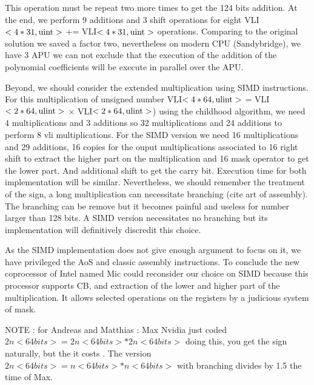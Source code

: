 \documentclass[11pt]{amsart}
\begin{document}
This operation must be repeat two more times to get the 124 bits addition. At the end, we perform 9 additions and 3  shift operations for eight VLI$<4*31, \texttt{\textrm{uint}}>$ += VLI$<4*31, \texttt{\textrm{uint}}>$ operations. 
 Comparing to the original solution we saved a factor two,  nevertheless on modern CPU (Sandybridge), we have 3 APU  we can not exclude that the execution of  the addition of the polynomial coefficients will be execute in parallel over the APU. 

Beyond, we should consider the extended  multiplication using SIMD instructions. For this multiplication of unsigned number   VLI$<4*64, \texttt{\textrm{ulint}}>$  = VLI$<2*64, \texttt{\textrm{ulint}}>$ $\times$ VLI$<2*64, \texttt{\textrm{ulint}}>$) using the
childhood  algorithm, we need 4 multiplications and 3 additions so 32 multiplications and 24 additions to perform 8 vli multiplications. For the SIMD version we need 16 multiplications and 29 additions, 16 copies for the ouput multiplications 
associated to 16 right shift  to extract the higher part on the multiplication and 16 mask operator to get the lower part. And additional shift to get the carry bit. Execution time for both implementation will be similar. Nevertheless, we should remember the treatment of the sign,  a long multiplication can necessitate branching (cite art of assembly). The branching can be remove but it  becomes painful and useless for number larger than 128 bits.  A SIMD version necessitates no branching but its implementation will definitively discredit this choice.

As the SIMD implementation does not give enough argument to focus on it, we have privileged  the AoS and classic assembly instructions. To conclude the new coprocessor of Intel named Mic could reconsider our choice on SIMD
because this processor supports CB, and extraction of the  lower and higher part of the multiplication. It allows selected operations on the registers by a judicious system of mask.

NOTE :  for Andreas and Matthias :
Max Nvidia just coded $2n <64 bits> =  2n <64 bits>* 2n <64 bits> $ doing this, you get the sign naturally, but the it costs . The version  $2n <64 bits> =  n <64 bits> * n <64 bits>$ with branching divides by 1.5 the time of Max.
\end{document}

